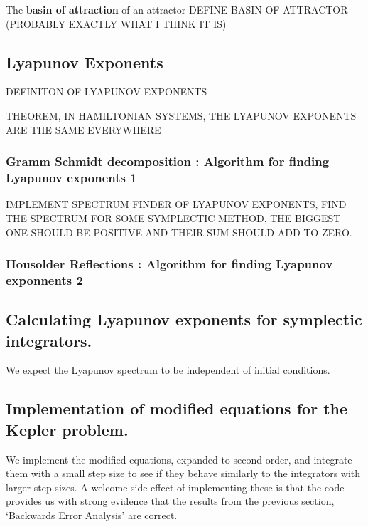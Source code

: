 \documentclass[12pt]{article}
\begin{document}
The \textbf{basin of attraction} of an attractor DEFINE BASIN OF ATTRACTOR (PROBABLY EXACTLY WHAT I THINK IT IS)\\



\subsection{Lyapunov Exponents}
DEFINITON OF LYAPUNOV EXPONENTS 

THEOREM, IN HAMILTONIAN SYSTEMS, THE LYAPUNOV EXPONENTS ARE THE SAME EVERYWHERE

\subsubsection{Gramm Schmidt decomposition : Algorithm for finding Lyapunov exponents 1}


IMPLEMENT SPECTRUM FINDER OF LYAPUNOV EXPONENTS, FIND THE SPECTRUM FOR SOME SYMPLECTIC METHOD, THE BIGGEST ONE SHOULD BE POSITIVE AND THEIR SUM SHOULD ADD TO ZERO.

\subsubsection{Housolder Reflections : Algorithm for finding Lyapunov exponnents 2}

\subsection{Calculating Lyapunov exponents for symplectic integrators.}
We expect the Lyapunov spectrum to be independent of initial conditions. 

\subsection{Implementation of modified equations for the Kepler problem.}
We implement the modified equations, expanded to second order, and integrate them with a small step size to see if they behave similarly to the integrators with larger step-sizes. A welcome side-effect of implementing these is that the code provides us with strong evidence that the results from the previous section, `Backwards Error Analysis' are correct. 

\end{document}
